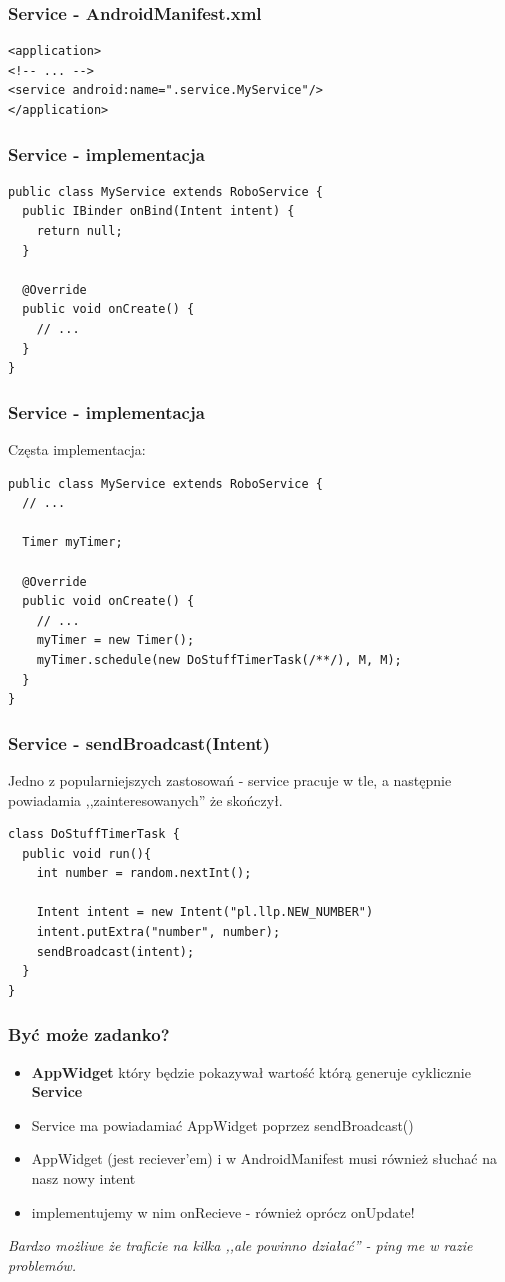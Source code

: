 \documentclass{beamer}
\begin{document}
\begin{frame}[fragile]\frametitle{Service - AndroidManifest.xml}
\begin{lstlisting}
<application>
<!-- ... -->
<service android:name=".service.MyService"/>
</application>
\end{lstlisting}
\end{frame}


\begin{frame}[fragile]\frametitle{Service - implementacja}
\begin{lstlisting}
public class MyService extends RoboService {
  public IBinder onBind(Intent intent) {
    return null;
  }

  @Override
  public void onCreate() {
    // ... 
  }
}
\end{lstlisting}
\end{frame}

\begin{frame}[fragile]\frametitle{Service - implementacja}
Częsta implementacja:
\begin{lstlisting}
public class MyService extends RoboService {
  // ...

  Timer myTimer;

  @Override
  public void onCreate() {
    // ... 
    myTimer = new Timer();
    myTimer.schedule(new DoStuffTimerTask(/**/), M, M);
  }
}
\end{lstlisting}
\end{frame}

\begin{frame}[fragile]\frametitle{Service - sendBroadcast(Intent)}
Jedno z popularniejszych zastosowań - service pracuje w tle, a następnie powiadamia ,,zainteresowanych'' że skończył.
\begin{lstlisting}
class DoStuffTimerTask {
  public void run(){
    int number = random.nextInt();

    Intent intent = new Intent("pl.llp.NEW_NUMBER")
    intent.putExtra("number", number);
    sendBroadcast(intent);
  }
}
\end{lstlisting}
\end{frame}

\begin{frame}\frametitle{Być może zadanko?}
\begin{itemize}
 \item \textbf{AppWidget} który będzie pokazywał wartość którą generuje cyklicznie \textbf{Service}
 \pause \item Service ma powiadamiać AppWidget poprzez sendBroadcast()
 \pause \item AppWidget (jest reciever'em) i w AndroidManifest musi również słuchać na nasz nowy intent
 \pause \item implementujemy w nim onRecieve - również oprócz onUpdate!
\end{itemize}
\pause \textit{Bardzo możliwe że traficie na kilka ,,ale powinno działać'' - ping me w razie problemów.}
\end{frame}
\end{document}
